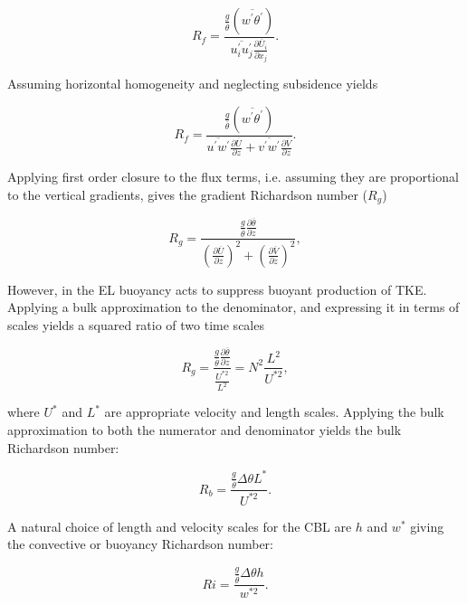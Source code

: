 \begin{equation}
R_{f} = \frac{\frac{g}{\overline{\theta}} \left( \overline{w^{'}\theta^{'}} \right)}{\overline{u_{i}^{'}u_{j}^{'}}\frac{\partial \overline{U}_{i}}{\partial x_{j}}}.
\end{equation}
 
Assuming horizontal homogeneity and neglecting subsidence yields
  
\begin{equation}
R_{f} = \frac{\frac{g}{\overline{\theta}} \left( \overline{w^{'}\theta^{'}} \right)}{\overline{u^{'}w^{'}}\frac{\partial \overline{U}}{\partial z} + \overline{v^{'}w^{'}}\frac{\partial \overline{V}}{\partial z}}.
\end{equation}

Applying first order closure to the flux terms, i.e. assuming they are proportional to the vertical gradients, gives the gradient Richardson number ($R_{g}$)

\begin{equation}
R_{g} = \frac{ \frac{g}{\overline{\theta}} \frac{\partial \overline{\theta}}{\partial z}}{\left( \frac{ \partial \overline{U}}{\partial z} \right)^{2} + \left( \frac{\partial \overline{V}}{\partial z} \right)^{2}}, 
\end{equation}

However, in the \acs{EL} buoyancy acts to suppress buoyant production of \acs{TKE}.  Applying a bulk approximation to the denominator, and expressing it in terms of scales yields a squared ratio of two time scales

\begin{equation}
R_{g} = \frac{\frac{g}{\overline{\theta}} \frac{\partial \overline{\theta}}{\partial z}}{\frac{U^{*2}}{L^{2}}} = N^{2}\frac{L^{2}}{U^{*2}},
\end{equation}

where $U^{*}$ and $L^{*}$ are appropriate velocity and length scales.  Applying the bulk approximation to both the numerator and denominator yields the bulk Richardson number:

\begin{equation}
R_{b} = \frac{\frac{g}{\overline{\theta}} \Delta \theta L^{*}}{U^{*2}}.
\end{equation}

A natural choice of length and velocity scales for the \acs{CBL} are $h$ and $w^{*}$ giving the convective or buoyancy Richardson number:

\begin{equation}
Ri = \frac{\frac{g}{\overline{\theta}} \Delta \theta h}{w^{*2}}.
\end{equation}

